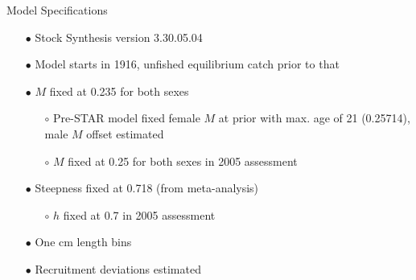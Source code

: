 \documentclass[ignorenonframetext,]{beamer}
\def\begincol{\begin{column}}
\def\endcol{\end{column}}
\def\endcols{\end{columns}}
\begin{document}

\begin{frame}{Model Specifications}

\begin{itemize}
\item[$\bullet$] Stock Synthesis version 3.30.05.04
\item[$\bullet$] Model starts in 1916, unfished equilibrium catch prior to that
\item[$\bullet$] $M$ fixed at 0.235 for both sexes
\begin{itemize}
\item[$\circ$] Pre-STAR model fixed female $M$ at prior with max. age of 21 (0.25714), male $M$ offset estimated
\item[$\circ$] $M$ fixed at 0.25 for both sexes in 2005 assessment
\end{itemize}
\item[$\bullet$] Steepness fixed at 0.718 (from meta-analysis)
\begin{itemize}
\item[$\circ$] $h$ fixed at 0.7 in 2005 assessment
\end{itemize}
\item[$\bullet$] One cm length bins
\item[$\bullet$] Recruitment deviations estimated
\end{itemize}

\end{frame}
\end{document}
